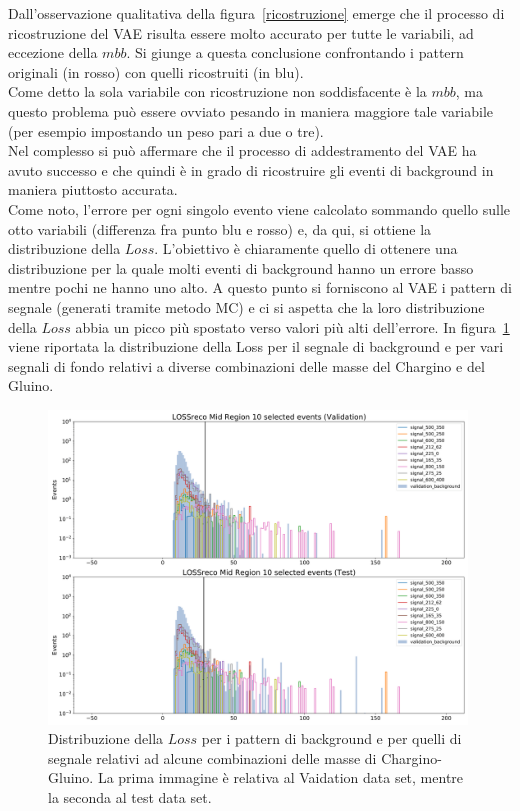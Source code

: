 Dall'osservazione qualitativa della figura~\ref{ricostruzione} emerge che il processo di ricostruzione del VAE risulta essere molto accurato per tutte le variabili, ad eccezione della $\textit{mbb}$. Si giunge a questa conclusione confrontando i pattern originali (in rosso) con quelli ricostruiti (in blu). \\
Come detto la sola variabile con ricostruzione non soddisfacente è la $\textit{mbb}$, ma questo problema può essere ovviato pesando in maniera maggiore tale variabile (per esempio impostando un peso pari a due o tre).\\
Nel complesso si può affermare che il processo di addestramento del VAE ha avuto successo e che quindi è in grado di ricostruire gli eventi di background in maniera piuttosto accurata. \\ 
Come noto, l'errore per ogni singolo evento viene calcolato sommando quello sulle otto variabili (differenza fra punto blu e rosso) e, da qui, si ottiene la distribuzione della $\textit{Loss}$. L'obiettivo è chiaramente quello di ottenere una distribuzione per la quale molti eventi di background hanno un errore basso mentre pochi ne hanno uno alto. A questo punto si forniscono al VAE i pattern di segnale (generati tramite metodo MC) e ci si aspetta che la loro distribuzione della $\textit{Loss}$ abbia un picco più spostato verso valori più alti dell'errore. In figura~\ref{distribuzione_loss} viene riportata la distribuzione della Loss per il segnale di background e per vari segnali di fondo relativi a diverse combinazioni delle masse del Chargino e del Gluino.

\begin{figure}[h!]
	\centering
	\includegraphics[width=0.99\textwidth]{figs/risultati_simulazione/distribuzioneLoss.png}
	\caption{Distribuzione della $\textit{Loss}$ per i pattern di background e per quelli di segnale relativi ad alcune combinazioni delle masse di Chargino-Gluino. La prima immagine è relativa al Vaidation data set, mentre la seconda al test data set.}
	\label{distribuzione_loss}
\end{figure}

